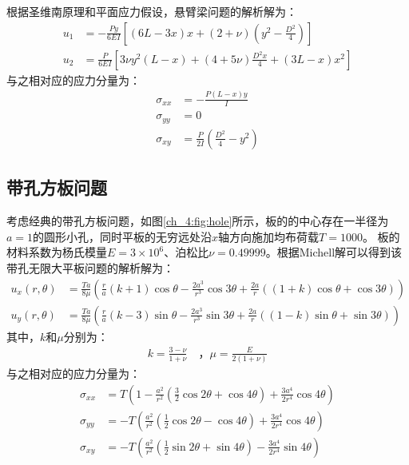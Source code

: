 根据圣维南原理和平面应力假设，悬臂梁问题的解析解为：
\begin{equation}
    \begin{split}
        u_1 &= -\frac{Py}{6EI}[(6L-3x)x + (2+\nu)(y^2 - \frac{D^2}{4})] \\
        u_2 &= \frac{P}{6EI}[3\nu y^2(L-x) + (4+5\nu)\frac{D^2x}{4} + (3L-x)x^2]
    \end{split}
\end{equation}
与之相对应的应力分量为：
\begin{equation}
\begin{split}
   \sigma_{xx}&=-\frac{P(L-x)y}{I}\\
   \sigma_{yy}&=0\\
   \sigma_{xy}&=\frac{P}{2I}(\frac{D^2}{4}-y^2)
\end{split}
\end{equation}

\subsection{带孔方板问题}

考虑经典的带孔方板问题，如图\ref{ch_4:fig:hole}所示，板的的中心存在一半径为$a=1$的圆形小孔，同时平板的无穷远处沿$x$轴方向施加均布荷载$T=1000$。 板的材料系数为杨氏模量$E=3\times10^6$、泊松比$\nu=0.49999$。根据Michell解可以得到该带孔无限大平板问题的解析解为：
\begin{equation}
    \begin{split}
        u_x(r,\theta)&=\frac{Ta}{8\mu}(\frac{r}{a}(k+1)\cos\theta-\frac{2a^3}{r^3}\cos3\theta    +\frac{2a}{r}((1+k)\cos\theta+\cos3\theta))\\
        u_y(r,\theta)&=\frac{Ta}{8\mu}(\frac{r}{a}(k-3)\sin\theta-\frac{2a^3}{r^3}\sin3\theta    +\frac{2a}{r}((1-k)\sin\theta+\sin3\theta))  
    \end{split}
\end{equation}
其中，$k$和$\mu$分别为：
\begin{equation}
    \begin{split}
        k=\frac{3-\nu}{1+\nu}\quad \text{，}\mu=\frac{E}{2(1+\nu)}
    \end{split}
\end{equation}
与之相对应的应力分量为：
\begin{equation}
\begin{split}
    \sigma_{xx}&=T(1-\frac{a^2}{r^2}(\frac{3}{2}\cos2\theta+\cos4\theta)+\frac{3a^4}{2r^4}\cos4\theta)\\
    \sigma_{yy}&=-T(\frac{a^2}{r^2}(\frac{1}{2}\cos2\theta-\cos4\theta)+\frac{3a^4}{2r^4}\cos4\theta)\\
    \sigma_{xy}&=-T(\frac{a^2}{r^2}(\frac{1}{2}\sin2\theta+\sin4\theta)-\frac{3a^4}{2r^4}\sin4\theta)\\
\end{split}
\end{equation}

